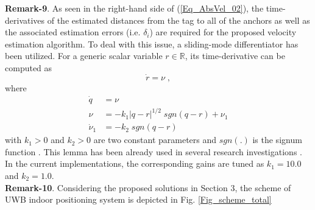 \documentclass{article}
\begin{document}
\textbf{Remark-9}. As seen in the right-hand side of (\ref{Eq_AbsVel_02}), the time-derivatives of the estimated distances from the tag to all of the anchors as well as the associated estimation errors (i.e. $\delta_i$) are required for the proposed velocity estimation algorithm. 
To deal with this issue, a sliding-mode differentiator has been utilized. 
For a generic scalar variable $r \in \mathbb{R}$, its time-derivative can be computed as \cite{Slid_Obs1,Slid_Obs}
\begin{equation} \label{Eq_AbsVel_05}
\dot{r} = \nu \;,
\end{equation}
where
\begin{equation} \label{Eq_AbsVel_06}
\begin{split}
\dot{q} &= \nu \\
\nu &= -k_1 |q - r|^{1/2} \; sgn(q - r) + \nu_1 \\
\dot{\nu}_1 &= -k_2 \; sgn(q - r)
\end{split}
\end{equation}
with $k_1>0$ and $k_2>0$ are two constant parameters and $sgn(.)$ is the signum function \cite{Slid_Obs1,Slid_Obs}. 
This lemma has been already used in several research investigations \cite{Ali_AMFC01,Ali_AMFC02,Ali_VelEst}. 
In the current implementations, the corresponding gains are tuned as $k_1 = 10.0$ and $k_2=1.0$. \\

\textbf{Remark-10}. Considering the proposed solutions in Section 3, the scheme of UWB indoor positioning system is depicted in Fig. \ref{Fig_scheme_total}
\end{document}
